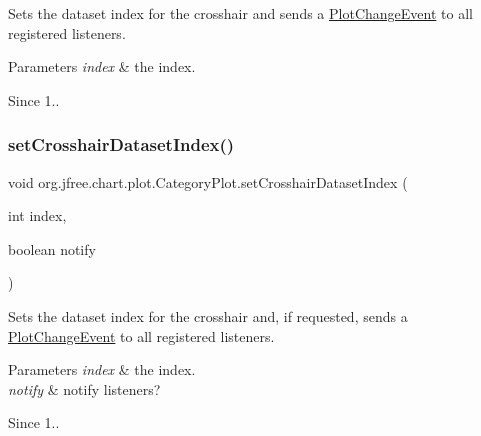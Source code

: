 Sets the dataset index for the crosshair and sends a \mbox{\hyperlink{}{Plot\+Change\+Event}} to all registered listeners.


\begin{DoxyParams}{Parameters}
{\em index} & the index.\\
\hline
\end{DoxyParams}
\begin{DoxySince}{Since}
1.. 
\end{DoxySince}
\mbox{\label{classorg_1_1jfree_1_1chart_1_1plot_1_1_category_plot_a4b9a59d0986c2273c61cc71449c1a1b1}} 
\subsubsection{\texorpdfstring{set\+Crosshair\+Dataset\+Index()}{setCrosshairDatasetIndex()}\hspace{0.1cm}{\footnotesize\ttfamily [2/2]}}
{\footnotesize\ttfamily void org.\+jfree.\+chart.\+plot.\+Category\+Plot.\+set\+Crosshair\+Dataset\+Index (\begin{DoxyParamCaption}\item[{int}]{index,  }\item[{boolean}]{notify }\end{DoxyParamCaption})}

Sets the dataset index for the crosshair and, if requested, sends a \mbox{\hyperlink{}{Plot\+Change\+Event}} to all registered listeners.


\begin{DoxyParams}{Parameters}
{\em index} & the index. \\
\hline
{\em notify} & notify listeners?\\
\hline
\end{DoxyParams}
\begin{DoxySince}{Since}
1.. 
\end{DoxySince}
\mbox{\label{classorg_1_1jfree_1_1chart_1_1plot_1_1_category_plot_af0a9e40a0ddee18dc429c2e8b1199b53}} 
